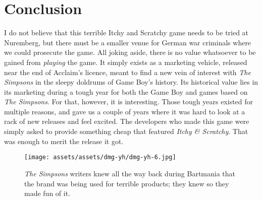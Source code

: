 \documentclass{book}
\begin{document}
\FloatBarrier\needspace{10mm}\section*{Conclusion}\nopagebreak[4]

I do not believe that this terrible Itchy and Scratchy game needs to be tried at Nuremberg, but there must be a smaller venue for German war criminals where we could prosecute the game. All joking aside, there is no value whatsoever to be gained from \emph{playing} the game. It simply exists as a marketing vehicle, released near the end of Acclaim’s licence, meant to find a new vein of interest with \emph{The Simpsons} in the sleepy doldrums of Game Boy’s history. Its historical value lies in its marketing during a tough year for both the Game Boy and games based on \emph{The Simpsons}. For that, however, it is interesting. Those tough years existed for multiple reasons, and gave us a couple of years where it was hard to look at a rack of new releases and feel excited. The developers who made this game were simply asked to provide something cheap that featured \emph{Itchy \& Scratchy}. That was enough to merit the release it got.

\begin{figure}[hbt]
\vskip 10pt
\centering \texttt{[image: assets/assets/dmg-yh/dmg-yh-6.jpg]}\par\pagetwodescription \emph{The Simpsons} writers knew all the way back during Bartmania that the brand was being used for terrible products; they knew so they made fun of it.
\vskip 6pt
\end{figure}
\end{document}
